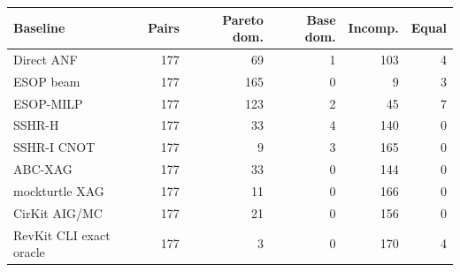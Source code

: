 \begin{tabularx}{\linewidth}{>{\raggedright\arraybackslash}Xrrrrr}
\toprule
Baseline & Pairs & Pareto dom. & Base dom. & Incomp. & Equal \\
\midrule
Direct ANF & 177 & 69 & 1 & 103 & 4 \\
ESOP beam & 177 & 165 & 0 & 9 & 3 \\
ESOP-MILP & 177 & 123 & 2 & 45 & 7 \\
SSHR-H & 177 & 33 & 4 & 140 & 0 \\
SSHR-I CNOT & 177 & 9 & 3 & 165 & 0 \\
ABC-XAG & 177 & 33 & 0 & 144 & 0 \\
mockturtle XAG & 177 & 11 & 0 & 166 & 0 \\
CirKit AIG/MC & 177 & 21 & 0 & 156 & 0 \\
RevKit CLI exact oracle & 177 & 3 & 0 & 170 & 4 \\
\bottomrule
\end{tabularx}
